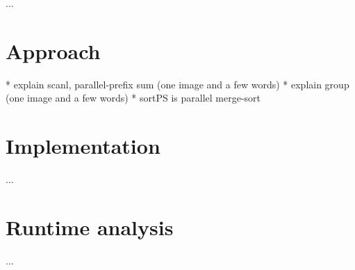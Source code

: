 

  ...
  
  \section{Approach}
    * explain scanl, parallel-prefix sum (one image and a few words)
    * explain group (one image and a few words)
    * sortPS is parallel merge-sort
  \section{Implementation}
    ...
  \section{Runtime analysis}
    ...

